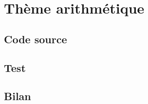 
\section{Thème arithmétique}

    \subsection{Code source}

        


    \subsection{Test}


    
    \subsection{Bilan}
